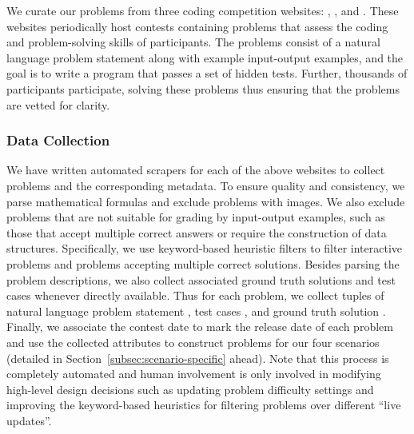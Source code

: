 We curate our problems from three coding competition websites: \leetcode{}, \atcoder{}, and \codeforces{}. 
These websites periodically host contests containing problems that assess the coding and problem-solving skills of participants.
The problems consist of a natural language problem statement along with example input-output examples, and the goal is to write a program that passes a set of hidden tests.
Further, thousands of participants participate, solving these problems thus ensuring that the problems are vetted for clarity.

\vspace{-3pt}
\subsubsection{Data Collection} 
We have written automated \html{} scrapers for each of the above websites to collect problems and the corresponding metadata.
To ensure quality and consistency, we parse mathematical formulas and exclude problems with images.
We also exclude problems that are not suitable for grading by input-output examples, such as those that accept multiple correct answers or require the construction of data structures.
Specifically, we use keyword-based heuristic filters to filter interactive problems and problems accepting multiple correct solutions.
Besides parsing the problem descriptions, we also collect associated ground truth solutions and test cases whenever directly available.
Thus for each problem, we collect tuples of  natural language problem statement \problem{}, 
test cases \tests{}, and ground truth solution \solution{}.
Finally, we associate the contest date \contestdate{} to mark the release date of each problem and 
use the collected attributes to construct problems for our four scenarios (detailed in Section~\ref{subsec:scenario-specific} ahead). 
Note that this process is completely automated and human involvement is only involved in modifying high-level design decisions such as updating problem difficulty settings and improving the keyword-based heuristics for filtering problems over different ``live updates''.


